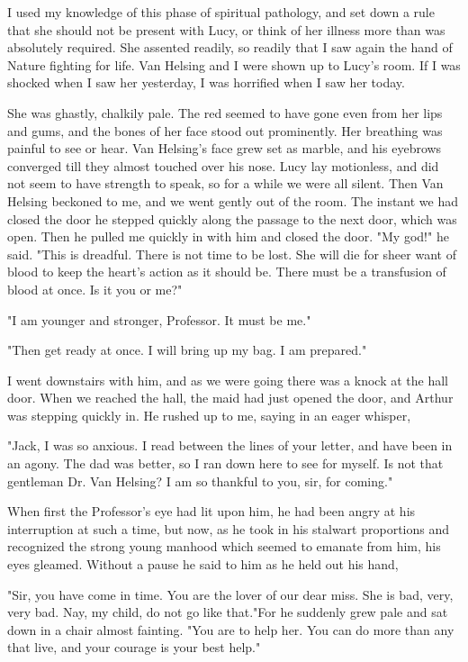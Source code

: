 I used my knowledge of this phase of spiritual pathology, and set down a rule that she should not be present with Lucy, or think of her illness more than was absolutely required. She assented readily, so readily that I saw again the hand of Nature fighting for life. Van Helsing and I were shown up to Lucy's room. If I was shocked when I saw her yesterday, I was horrified when I saw her today. 

She was ghastly, chalkily pale. The red seemed to have gone even from her lips and gums, and the bones of her face stood out prominently. Her breathing was painful to see or hear. Van Helsing's face grew set as marble, and his eyebrows converged till they almost touched over his nose. Lucy lay motionless, and did not seem to have strength to speak, so for a while we were all silent. Then Van Helsing beckoned to me, and we went gently out of the room. The instant we had closed the door he stepped quickly along the passage to the next door, which was open. Then he pulled me quickly in with him and closed the door. "My god!" he said. "This is dreadful. There is not time to be lost. She will die for sheer want of blood to keep the heart's action as it should be. There must be a transfusion of blood at once. Is it you or me?" 

"I am younger and stronger, Professor. It must be me." 

"Then get ready at once. I will bring up my bag. I am prepared." 

I went downstairs with him, and as we were going there was a knock at the hall door. When we reached the hall, the maid had just opened the door, and Arthur was stepping quickly in. He rushed up to me, saying in an eager whisper, 

"Jack, I was so anxious. I read between the lines of your letter, and have been in an agony. The dad was better, so I ran down here to see for myself. Is not that gentleman Dr. Van Helsing? I am so thankful to you, sir, for coming." 

When first the Professor's eye had lit upon him, he had been angry at his interruption at such a time, but now, as he took in his stalwart proportions and recognized the strong young manhood which seemed to emanate from him, his eyes gleamed. Without a pause he said to him as he held out his hand, 

"Sir, you have come in time. You are the lover of our dear miss. She is bad, very, very bad. Nay, my child, do not go like that."For he suddenly grew pale and sat down in a chair almost fainting. "You are to help her. You can do more than any that live, and your courage is your best help." 

